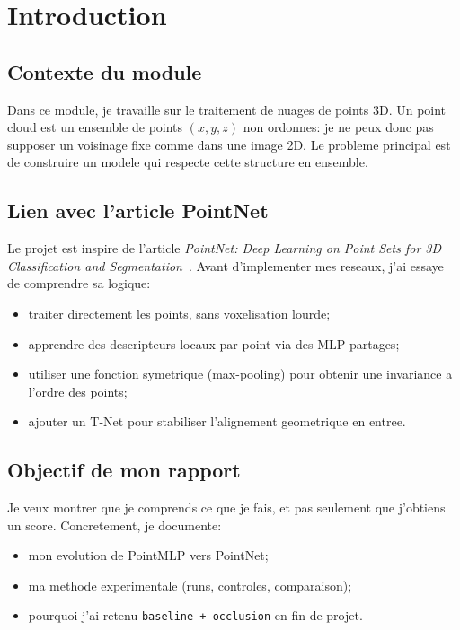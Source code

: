 \chapter{Introduction}

\section{Contexte du module}
Dans ce module, je travaille sur le traitement de nuages de points 3D.
Un point cloud est un ensemble de points \((x,y,z)\) non ordonnes: je ne peux donc pas supposer un voisinage fixe comme dans une image 2D.
Le probleme principal est de construire un modele qui respecte cette structure en ensemble.

\section{Lien avec l'article PointNet}
Le projet est inspire de l'article \textit{PointNet: Deep Learning on Point Sets for 3D Classification and Segmentation}~\cite{qi2017pointnet}.
Avant d'implementer mes reseaux, j'ai essaye de comprendre sa logique:
\begin{itemize}
  \item traiter directement les points, sans voxelisation lourde;
  \item apprendre des descripteurs locaux par point via des MLP partages;
  \item utiliser une fonction symetrique (max-pooling) pour obtenir une invariance a l'ordre des points;
  \item ajouter un T-Net pour stabiliser l'alignement geometrique en entree.
\end{itemize}

\section{Objectif de mon rapport}
Je veux montrer que je comprends ce que je fais, et pas seulement que j'obtiens un score.
Concretement, je documente:
\begin{itemize}
  \item mon evolution de PointMLP vers PointNet;
  \item ma methode experimentale (runs, controles, comparaison);
  \item pourquoi j'ai retenu \texttt{baseline + occlusion} en fin de projet.
\end{itemize}
